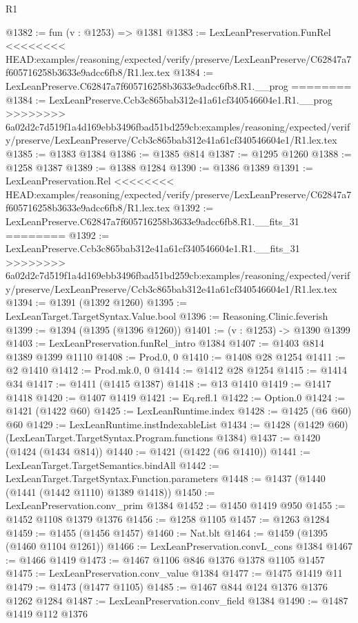 \begin{lexlean}{R1}
\begin{coremodule}
{{{{{{{{{{{{{{{{{{{{{{{{{{{{{{{{{{{{{{{{{{{{{{{{{{{{{{{{{{{{{{{{{{{{{{{{{{{{{{{{{{{{{{{{{{@1382 := fun (v : @1253) => @1381
@1383 := LexLeanPreservation.FunRel
<<<<<<<< HEAD:examples/reasoning/expected/verify/preserve/LexLeanPreserve/C62847a7f605716258b3633e9adcc6fb8/R1.lex.tex
@1384 := LexLeanPreserve.C62847a7f605716258b3633e9adcc6fb8.R1.__prog
========
@1384 := LexLeanPreserve.Ccb3c865bab312e41a61cf340546604e1.R1.__prog
>>>>>>>> 6a02d2c7d519f1a4d169ebb3496fbad51bd259cb:examples/reasoning/expected/verify/preserve/LexLeanPreserve/Ccb3c865bab312e41a61cf340546604e1/R1.lex.tex
@1385 := @1383 @1384
@1386 := @1385 @814
@1387 := @1295 @1260
@1388 := @1258 @1387
@1389 := @1388 @1284
@1390 := @1386 @1389
@1391 := LexLeanPreservation.Rel
<<<<<<<< HEAD:examples/reasoning/expected/verify/preserve/LexLeanPreserve/C62847a7f605716258b3633e9adcc6fb8/R1.lex.tex
@1392 := LexLeanPreserve.C62847a7f605716258b3633e9adcc6fb8.R1.__fits_31
========
@1392 := LexLeanPreserve.Ccb3c865bab312e41a61cf340546604e1.R1.__fits_31
>>>>>>>> 6a02d2c7d519f1a4d169ebb3496fbad51bd259cb:examples/reasoning/expected/verify/preserve/LexLeanPreserve/Ccb3c865bab312e41a61cf340546604e1/R1.lex.tex
@1394 := @1391 (@1392 @1260)
@1395 := LexLeanTarget.TargetSyntax.Value.bool
@1396 := Reasoning.Clinic.feverish
@1399 := @1394 (@1395 (@1396 @1260))
@1401 := (v : @1253) -> @1390 @1399
@1403 := LexLeanPreservation.funRel_intro @1384
@1407 := @1403 @814 @1389 @1399 @1110
@1408 := Prod.{0, 0}
@1410 := @1408 @28 @1254
@1411 := @2 @1410
@1412 := Prod.mk.{0, 0}
@1414 := @1412 @28 @1254
@1415 := @1414 @34
@1417 := @1411 (@1415 @1387)
@1418 := @13 @1410
@1419 := @1417 @1418
@1420 := @1407 @1419
@1421 := Eq.refl.{1}
@1422 := Option.{0}
@1424 := @1421 (@1422 @60)
@1425 := LexLeanRuntime.index
@1428 := @1425 (@6 @60) @60
@1429 := LexLeanRuntime.instIndexableList
@1434 := @1428 (@1429 @60) (LexLeanTarget.TargetSyntax.Program.functions @1384)
@1437 := @1420 (@1424 (@1434 @814))
@1440 := @1421 (@1422 (@6 @1410))
@1441 := LexLeanTarget.TargetSemantics.bindAll
@1442 := LexLeanTarget.TargetSyntax.Function.parameters
@1448 := @1437 (@1440 (@1441 (@1442 @1110) @1389 @1418))
@1450 := LexLeanPreservation.conv_prim @1384
@1452 := @1450 @1419 @950
@1455 := @1452 @1108 @1379 @1376
@1456 := @1258 @1105
@1457 := @1263 @1284
@1459 := @1455 (@1456 @1457)
@1460 := Nat.blt
@1464 := @1459 (@1395 (@1460 @1104 @1261))
@1466 := LexLeanPreservation.convL_cons @1384
@1467 := @1466 @1419
@1473 := @1467 @1106 @846 @1376 @1378 @1105 @1457
@1475 := LexLeanPreservation.conv_value @1384
@1477 := @1475 @1419 @11
@1479 := @1473 (@1477 @1105)
@1485 := @1467 @844 @124 @1376 @1376 @1262 @1284
@1487 := LexLeanPreservation.conv_field @1384
@1490 := @1487 @1419 @112 @1376
}}}}}}}}}}}}}}}}}}}}}}}}}}}}}}}}}}}}}}}}}}}}}}}}}}}}}}}}}}}}}}}}}}}}}}}}}}}}}}}}}}}}}}}}}}
\end{coremodule}
\end{lexlean}
